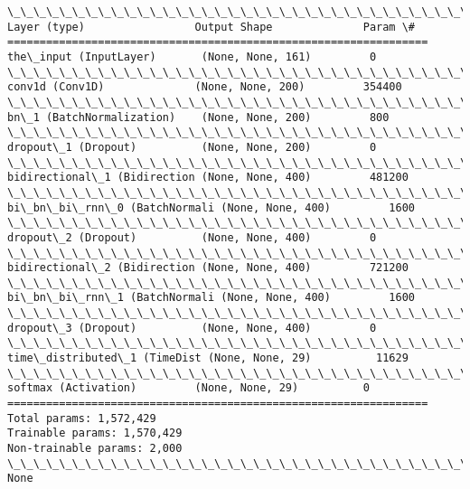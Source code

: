 \documentclass[11pt]{article}
\begin{document}
    \begin{Verbatim}[commandchars=\\\{\}]
\_\_\_\_\_\_\_\_\_\_\_\_\_\_\_\_\_\_\_\_\_\_\_\_\_\_\_\_\_\_\_\_\_\_\_\_\_\_\_\_\_\_\_\_\_\_\_\_\_\_\_\_\_\_\_\_\_\_\_\_\_\_\_\_\_
Layer (type)                 Output Shape              Param \#   
=================================================================
the\_input (InputLayer)       (None, None, 161)         0         
\_\_\_\_\_\_\_\_\_\_\_\_\_\_\_\_\_\_\_\_\_\_\_\_\_\_\_\_\_\_\_\_\_\_\_\_\_\_\_\_\_\_\_\_\_\_\_\_\_\_\_\_\_\_\_\_\_\_\_\_\_\_\_\_\_
conv1d (Conv1D)              (None, None, 200)         354400    
\_\_\_\_\_\_\_\_\_\_\_\_\_\_\_\_\_\_\_\_\_\_\_\_\_\_\_\_\_\_\_\_\_\_\_\_\_\_\_\_\_\_\_\_\_\_\_\_\_\_\_\_\_\_\_\_\_\_\_\_\_\_\_\_\_
bn\_1 (BatchNormalization)    (None, None, 200)         800       
\_\_\_\_\_\_\_\_\_\_\_\_\_\_\_\_\_\_\_\_\_\_\_\_\_\_\_\_\_\_\_\_\_\_\_\_\_\_\_\_\_\_\_\_\_\_\_\_\_\_\_\_\_\_\_\_\_\_\_\_\_\_\_\_\_
dropout\_1 (Dropout)          (None, None, 200)         0         
\_\_\_\_\_\_\_\_\_\_\_\_\_\_\_\_\_\_\_\_\_\_\_\_\_\_\_\_\_\_\_\_\_\_\_\_\_\_\_\_\_\_\_\_\_\_\_\_\_\_\_\_\_\_\_\_\_\_\_\_\_\_\_\_\_
bidirectional\_1 (Bidirection (None, None, 400)         481200    
\_\_\_\_\_\_\_\_\_\_\_\_\_\_\_\_\_\_\_\_\_\_\_\_\_\_\_\_\_\_\_\_\_\_\_\_\_\_\_\_\_\_\_\_\_\_\_\_\_\_\_\_\_\_\_\_\_\_\_\_\_\_\_\_\_
bi\_bn\_bi\_rnn\_0 (BatchNormali (None, None, 400)         1600      
\_\_\_\_\_\_\_\_\_\_\_\_\_\_\_\_\_\_\_\_\_\_\_\_\_\_\_\_\_\_\_\_\_\_\_\_\_\_\_\_\_\_\_\_\_\_\_\_\_\_\_\_\_\_\_\_\_\_\_\_\_\_\_\_\_
dropout\_2 (Dropout)          (None, None, 400)         0         
\_\_\_\_\_\_\_\_\_\_\_\_\_\_\_\_\_\_\_\_\_\_\_\_\_\_\_\_\_\_\_\_\_\_\_\_\_\_\_\_\_\_\_\_\_\_\_\_\_\_\_\_\_\_\_\_\_\_\_\_\_\_\_\_\_
bidirectional\_2 (Bidirection (None, None, 400)         721200    
\_\_\_\_\_\_\_\_\_\_\_\_\_\_\_\_\_\_\_\_\_\_\_\_\_\_\_\_\_\_\_\_\_\_\_\_\_\_\_\_\_\_\_\_\_\_\_\_\_\_\_\_\_\_\_\_\_\_\_\_\_\_\_\_\_
bi\_bn\_bi\_rnn\_1 (BatchNormali (None, None, 400)         1600      
\_\_\_\_\_\_\_\_\_\_\_\_\_\_\_\_\_\_\_\_\_\_\_\_\_\_\_\_\_\_\_\_\_\_\_\_\_\_\_\_\_\_\_\_\_\_\_\_\_\_\_\_\_\_\_\_\_\_\_\_\_\_\_\_\_
dropout\_3 (Dropout)          (None, None, 400)         0         
\_\_\_\_\_\_\_\_\_\_\_\_\_\_\_\_\_\_\_\_\_\_\_\_\_\_\_\_\_\_\_\_\_\_\_\_\_\_\_\_\_\_\_\_\_\_\_\_\_\_\_\_\_\_\_\_\_\_\_\_\_\_\_\_\_
time\_distributed\_1 (TimeDist (None, None, 29)          11629     
\_\_\_\_\_\_\_\_\_\_\_\_\_\_\_\_\_\_\_\_\_\_\_\_\_\_\_\_\_\_\_\_\_\_\_\_\_\_\_\_\_\_\_\_\_\_\_\_\_\_\_\_\_\_\_\_\_\_\_\_\_\_\_\_\_
softmax (Activation)         (None, None, 29)          0         
=================================================================
Total params: 1,572,429
Trainable params: 1,570,429
Non-trainable params: 2,000
\_\_\_\_\_\_\_\_\_\_\_\_\_\_\_\_\_\_\_\_\_\_\_\_\_\_\_\_\_\_\_\_\_\_\_\_\_\_\_\_\_\_\_\_\_\_\_\_\_\_\_\_\_\_\_\_\_\_\_\_\_\_\_\_\_
None

    \end{Verbatim}
\end{document}
